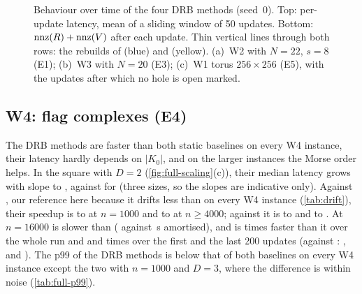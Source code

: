 \begin{figure}[t]
  \centering
  \caption{Behaviour over time of the four DRB methods (seed~0). Top: per-update
    latency, mean of a sliding window of 50 updates. Bottom: $\operatorname{nnz}(R)+\operatorname{nnz}(V)$
    after each update. Thin vertical lines through both rows: the rebuilds of
     (blue) and  (yellow). (a)~W2 with $N=22$, $s=8$ (E1); (b)~W3 with $N=20$ (E3);
    (c)~W1 torus $256\times256$ (E5), with the updates after which no hole is
    open marked.}
  \label{fig:timeseries}
\end{figure}

\subsection{W4: flag complexes (E4)}\label{sec:e4}


The DRB methods are faster than both static baselines on every W4 instance, their
latency hardly depends on $|K_0|$, and on the larger instances the Morse order
helps. In the square with $D=2$ (\cref{fig:full-scaling}(c)), their median
latency grows with slope \NumSlopeEFourWFourPlaneDTwoMmhmNorbMed{} to
\NumSlopeEFourWFourPlaneDTwoDrbIdRbMed, against
\NumSlopeEFourWFourPlaneDTwoFullIdMed{} for  (three sizes, so the
slopes are indicative only). Against , our reference here
because it drifts less than  on every W4 instance
(\cref{tab:drift}), their speedup is
\NumWFourSpaceNOneThousandDThreeDrbIdRbSpeedupFullSorted{} to
\NumWFourPlaneNOneThousandDTwoMmhmNorbSpeedupFullSorted{} at $n=1000$ and
\NumWFourPlaneNFourThousandDThreeDrbIdSpeedupFullSorted{} to
\NumWFourPlaneNSixteenThousandDTwoMmhmNorbSpeedupFullSorted{} at $n\ge4000$;
against  it is
\NumWFourSpaceNOneThousandDThreeDrbIdRbSpeedupFullId{} to
\NumWFourPlaneNOneThousandDTwoMmhmNorbSpeedupFullId{} and
\NumWFourPlaneNFourThousandDThreeDrbIdSpeedupFullId{} to
\NumWFourPlaneNSixteenThousandDTwoMmhmNorbSpeedupFullId. At $n=16000$
 is slower than 
(\NumWFourPlaneNSixteenThousandDTwoFullSortedAmort{} against
\NumWFourPlaneNSixteenThousandDTwoFullIdAmort\,\textmu s amortised), and
 is \NumWFourPlaneNSixteenThousandDTwoMmhmSpeedupFullSorted{} times
faster than it over the whole run and
\NumWFourPlaneNSixteenThousandDTwoMmhmSpeedupFullSortedFirstBlock{} and
\NumWFourPlaneNSixteenThousandDTwoMmhmSpeedupFullSortedLastBlock{} times over the
first and the last 200 updates (against :
\NumWFourPlaneNSixteenThousandDTwoMmhmSpeedupFullId,
\NumWFourPlaneNSixteenThousandDTwoMmhmSpeedupFullIdFirstBlock{} and
\NumWFourPlaneNSixteenThousandDTwoMmhmSpeedupFullIdLastBlock). The p99 of the
DRB methods is below that of both baselines on every W4 instance except the two
with $n=1000$ and $D=3$, where the difference is within noise
(\cref{tab:full-p99}).


